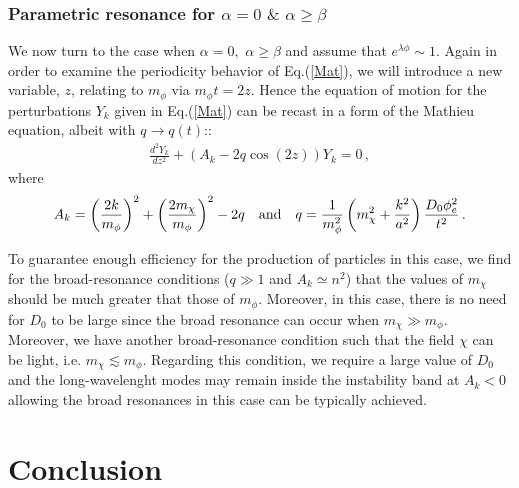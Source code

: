 \documentclass[aps,prd,amsmath,amssymb,preprintnumbers,onecolumn,11pt,nofootinbib]{revtex4}
\begin{document}
\subsubsection{{\rm Parametric resonance for} $\alpha=0\,\,\&\,\,\alpha\geq \beta$}
We now turn to the case when $\alpha =0,\,\,\alpha\geq \beta$ and assume that $e^{\lambda\phi} \sim 1$. Again in order to examine the periodicity behavior of Eq.(\ref{Mat}), we will introduce a new variable, $z$, relating to $m_{\phi}$ via $m_\phi t = 2 z$. Hence the equation of motion for the perturbations $Y_{k}$ given in Eq.(\ref{Mat}) can be recast in a form of the Mathieu equation, albeit with $q\rightarrow q(t)$::
\begin{eqnarray}
\frac{d^{2}Y_{k}}{dz^{2}} + \left(A_{k} -2q\cos(2z)\right)Y_{k} = 0\,,
\label{Mathe2}
\end{eqnarray}
where
\begin{eqnarray}
A_{k} = \left(\frac{2k}{m_{\phi}}\right)^{2} + \left(\frac{2m_{\chi}}{m_{\phi}}\right)^{2}-2q \quad{\rm and}\quad 
q = \frac{1}{m^{2}_{\phi}}\left(m^{2}_{\chi} + \frac{k^{2}}{a^{2}}\right)\frac{D_{0}\phi^{2}_{e}}{t^{2}}\,.
\label{Mathe13}
\end{eqnarray}

To guarantee enough efficiency for the production of particles in this case, we find for the broad-resonance conditions ($q\gg 1$ and $A_{k}\simeq n^{2}$) that the values of $m_{\chi}$ should be much greater that those of $m_{\phi}$. Moreover, in this case, there is no need for $D_{0}$ to be large since the broad resonance can occur when $m_\chi \gg m_\phi$. Moreover, we have another broad-resonance condition such that the field $\chi$ can be light, i.e. $m_{\chi} \lesssim m_{\phi}$. Regarding this condition, we require a large value of $D_{0}$ and the long-wavelenght modes may remain inside the instability band at $A_{k} <0$ allowing the broad resonances in this case can be typically achieved.

\section{Conclusion}
\end{document}
